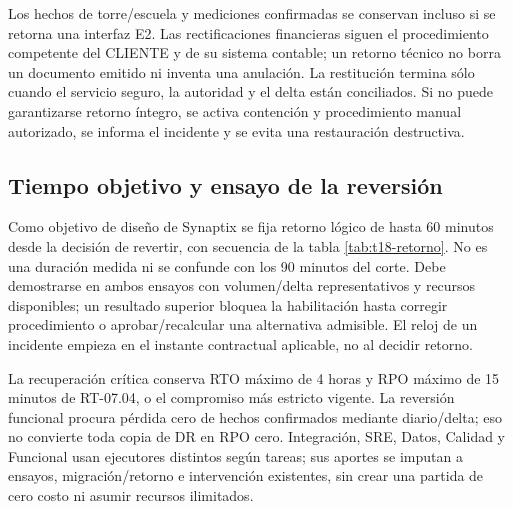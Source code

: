 Los hechos de torre/escuela y mediciones confirmadas se conservan incluso si se retorna una interfaz E2. Las rectificaciones financieras siguen el procedimiento competente del CLIENTE y de su sistema contable; un retorno técnico no borra un documento emitido ni inventa una anulación. La restitución termina sólo cuando el servicio seguro, la autoridad y el delta están conciliados. Si no puede garantizarse retorno íntegro, se activa contención y procedimiento manual autorizado, se informa el incidente y se evita una restauración destructiva.

\subsection{Tiempo objetivo y ensayo de la reversión}
Como objetivo de diseño de Synaptix se fija retorno lógico de hasta 60 minutos desde la decisión de revertir, con secuencia de la tabla \ref{tab:t18-retorno}. No es una duración medida ni se confunde con los 90 minutos del corte. Debe demostrarse en ambos ensayos con volumen/delta representativos y recursos disponibles; un resultado superior bloquea la habilitación hasta corregir procedimiento o aprobar/recalcular una alternativa admisible. El reloj de un incidente empieza en el instante contractual aplicable, no al decidir retorno.

La recuperación crítica conserva RTO máximo de 4 horas y RPO máximo de 15 minutos de RT-07.04, o el compromiso más estricto vigente. La reversión funcional procura pérdida cero de hechos confirmados mediante diario/delta; eso no convierte toda copia de DR en RPO cero. Integración, SRE, Datos, Calidad y Funcional usan ejecutores distintos según tareas; sus aportes se imputan a ensayos, migración/retorno e intervención existentes, sin crear una partida de cero costo ni asumir recursos ilimitados.

